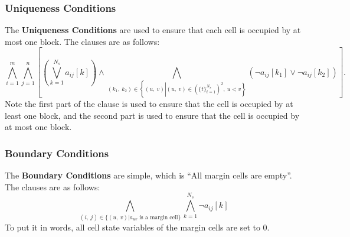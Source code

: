 \documentclass[12pt, a4paper]{article}
\theoremstyle{mystyle}
\begin{document}
        \subsubsection{Uniqueness Conditions}
        The \textbf{Uniqueness Conditions} are used to ensure that each cell is occupied by at most one block. The clauses are as follows:
        $$\bigwedge_{i=1}^m\bigwedge_{j=1}^n\left[\left(\bigvee_{k=1}^{N_s}a_{ij}[k]\right)\land \bigwedge_{(k_1,\ k_2)\in \left\{(u,\ v)\left|(u,\ v)\in\left(\{t\}_{t=1}^{N_s}\right)^2,\ u<v\right.\right\}}\left(\lnot a_{ij}\left[k_1\right]\lor \lnot a_{ij}\left[k_2\right]\right)\right].$$
        Note the first part of the clause is used to ensure that the cell is occupied by at least one block, and the second part is used to ensure that the cell is occupied by at most one block.
        \subsubsection{Boundary Conditions}
        The \textbf{Boundary Conditions} are simple, which is ``All margin cells are empty''. The clauses are as follows:
        $$\bigwedge_{(i,\ j)\in\{(u,\ v)|a_{uv}\textrm{ is a margin cell}\}}\bigwedge_{k=1}^{N_s}\lnot a_{ij}[k]$$ 
        To put it in words, all cell state variables of the margin cells are set to 0.
\end{document}
